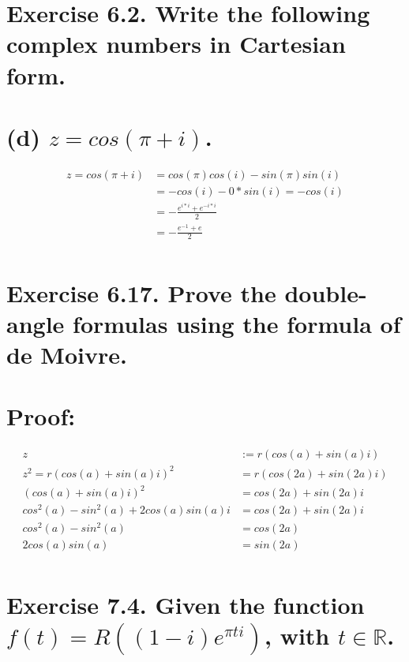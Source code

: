 \documentclass[15px]{article}
\begin{document}
\section*{Exercise 6.2. \normalfont Write the following complex numbers in Cartesian form.}

\section*{\normalfont (d)  $z = cos(\pi + i)$.}

\begin{equation}
\begin{split}
z = cos(\pi + i) & = cos(\pi)cos(i) - sin(\pi)sin(i) \\
& = -cos(i) - 0*sin(i) = -cos(i) \\
& = -\frac{e^{i*i} + e^{-i*i}}{2} \\
& = -\frac{e^{-1} + e}{2} \\
\end{split}
\end{equation}

\section*{Exercise 6.17. \normalfont Prove the double-angle formulas using the formula of de Moivre.}

\section*{Proof:}

\begin{equation}
\begin{split}
z & := r(cos(a) + sin(a)i)\\
z^2 = r(cos(a) + sin(a)i)^2 & = r(cos(2a) + sin(2a)i) \\
(cos(a) + sin(a)i)^2 & = cos(2a) + sin(2a)i \\
cos^2(a) - sin^2(a) + 2cos(a)sin(a)i & = cos(2a) + sin(2a)i \\
cos^2(a) - sin^2(a) & = cos(2a) \\
2cos(a)sin(a) & = sin(2a) \\
\end{split}
\end{equation}

\section*{Exercise 7.4. \normalfont Given the function $f(t) = R((1 - i)e^{\pi ti})$, with $t \in \mathbb{R}$.}
\end{document}
